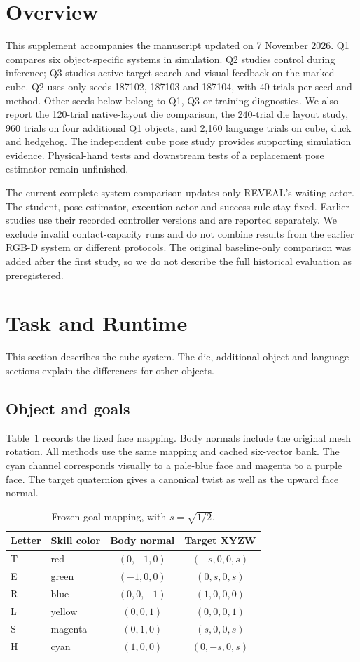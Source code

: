 \section{Overview}
This supplement accompanies the manuscript updated on 7 November 2026. Q1 compares six object-specific systems in simulation. Q2 studies control during inference; Q3 studies active target search and visual feedback on the marked cube. Q2 uses only seeds 187102, 187103 and 187104, with 40 trials per seed and method. Other seeds below belong to Q1, Q3 or training diagnostics. We also report the 120-trial native-layout die comparison, the 240-trial die layout study, 960 trials on four additional Q1 objects, and 2,160 language trials on cube, duck and hedgehog. The independent cube pose study provides supporting simulation evidence. Physical-hand tests and downstream tests of a replacement pose estimator remain unfinished.

The current complete-system comparison updates only REVEAL's waiting actor. The student, pose estimator, execution actor and success rule stay fixed. Earlier studies use their recorded controller versions and are reported separately. We exclude invalid contact-capacity runs and do not combine results from the earlier RGB-D system or different protocols. The original baseline-only comparison was added after the first study, so we do not describe the full historical evaluation as preregistered.

\section{Task and Runtime}
This section describes the cube system. The die, additional-object and language sections explain the differences for other objects.
\subsection{Object and goals}
Table~\ref{tab:mapping} records the fixed face mapping. Body normals include the original mesh rotation. All methods use the same mapping and cached six-vector bank. The cyan channel corresponds visually to a pale-blue face and magenta to a purple face. The target quaternion gives a canonical twist as well as the upward face normal.

\begin{table}[h]
\centering\small
\begin{tabular}{llcc}
\toprule
Letter & Skill color & Body normal & Target XYZW\\
\midrule
T & red & $(0,-1,0)$ & $(-s,0,0,s)$\\
E & green & $(-1,0,0)$ & $(0,s,0,s)$\\
R & blue & $(0,0,-1)$ & $(1,0,0,0)$\\
L & yellow & $(0,0,1)$ & $(0,0,0,1)$\\
S & magenta & $(0,1,0)$ & $(s,0,0,s)$\\
H & cyan & $(1,0,0)$ & $(0,-s,0,s)$\\
\bottomrule
\end{tabular}
\caption{Frozen goal mapping, with $s=\sqrt{1/2}$.}
\label{tab:mapping}
\end{table}

